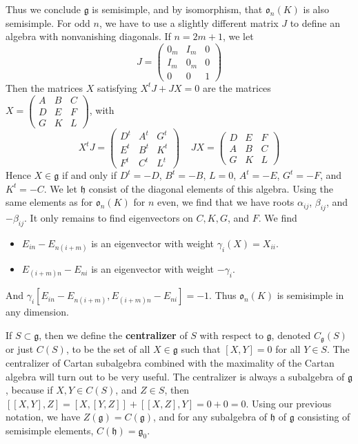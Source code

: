 \begin{example}
\begin{itemize}
    \end{itemize}
    Thus we conclude $\mathfrak{g}$ is semisimple, and by isomorphism, that $\mathfrak{o}_n(K)$ is also semisimple. For odd $n$, we have to use a slightly different matrix $J$ to define an algebra with nonvanishing diagonals. If $n = 2m + 1$, we let
    \[ J = \begin{pmatrix} 0_m & I_m & 0 \\ I_m & 0_m & 0 \\ 0 & 0 & 1 \end{pmatrix} \]
    Then the matrices $X$ satisfying $X^tJ + JX = 0$ are the matrices $X = \left( \begin{smallmatrix} A & B & C \\ D & E & F \\ G & K & L \end{smallmatrix} \right)$, with
    \[ X^tJ = \begin{pmatrix} D^t & A^t & G^t \\ E^t & B^t & K^t \\ F^t & C^t & L^t \end{pmatrix}\ \ \ \ \ JX = \begin{pmatrix} D & E & F \\ A & B & C \\ G & K & L \end{pmatrix} \]
    Hence $X \in \mathfrak{g}$ if and only if $D^t = -D$, $B^t = -B$, $L = 0$, $A^t = -E$, $G^t = -F$, and $K^t = -C$. We let $\mathfrak{h}$ consist of the diagonal elements of this algebra. Using the same elements as for $\mathfrak{o}_n(K)$ for $n$ even, we find that we have roots $\alpha_{ij}$, $\beta_{ij}$, and $-\beta_{ij}$. It only remains to find eigenvectors on $C,K,G$, and $F$. We find
    \begin{itemize}
        \item $E_{in} - E_{n(i + m)}$ is an eigenvector with weight $\gamma_i(X) = X_{ii}$.
        \item $E_{(i + m)n} - E_{ni}$ is an eigenvector with weight $-\gamma_i$.
    \end{itemize}
    And $\gamma_i[E_{in} - E_{n(i+m)}, E_{(i+m)n} - E_{ni}] = -1$. Thus $\mathfrak{o}_n(K)$ is semisimple in any dimension.
\end{example}

If $S \subset \mathfrak{g}$, then we define the {\bf centralizer} of $S$ with respect to $\mathfrak{g}$, denoted $C_\mathfrak{g}(S)$ or just $C(S)$, to be the set of all $X \in \mathfrak{g}$ such that $[X,Y] = 0$ for all $Y \in S$. The centralizer of Cartan subalgebra combined with the maximality of the Cartan algebra will turn out to be very useful. The centralizer is always a subalgebra of $\mathfrak{g}$, because if $X,Y \in C(S)$, and $Z \in S$, then $[[X,Y],Z] = [X,[Y,Z]] + [[X,Z],Y] = 0 + 0 = 0$. Using our previous notation, we have $Z(\mathfrak{g}) = C(\mathfrak{g})$, and for any subalgebra of $\mathfrak{h}$ of $\mathfrak{g}$ consisting of semisimple elements, $C(\mathfrak{h}) = \mathfrak{g}_0$.

